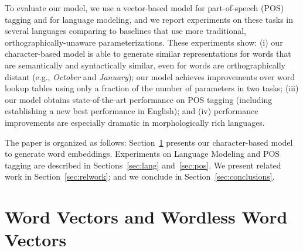 \documentclass[11pt]{article}
\newcommand{\ignore}[1]{}
\newcommand{\examp}[1]{\emph{#1}}
\begin{document}
\begin{CJK*}{UTF8}{gbsn}
To evaluate our model, we use a vector-based model for part-of-speech (POS) tagging and for language modeling, and we report experiments on these tasks in several languages comparing to baselines that use more traditional, orthographically-unaware parameterizations. These experiments show: (i) our character-based model is able to generate similar representations for words that are semantically and syntactically similar, even for words are orthographically distant (e.g., \examp{October} and \examp{January}); our model achieves improvements over word lookup tables using only a fraction of the number of parameters in two tasks; (iii) our model obtains state-of-the-art performance on POS tagging (including establishing a new best performance in English); and (iv) performance improvements are especially dramatic in morphologically rich languages.







The paper is organized as follows:  Section~\ref{sec:c2v} presents our character-based model to generate word embeddings. Experiments on Language Modeling and POS tagging are described in Sections~\ref{sec:lang} and~\ref{sec:pos}. We present related work in Section~\ref{sec:relwork}; and we conclude in Section~\ref{sec:conclusions}.

\section{Word Vectors and Wordless Word Vectors}
\label{sec:c2v}
\ignore{Most NLP methods convert words into a sparse representation, where word types are treated independently. For instance, multinomial distributions that compute the probability of word $w$ being labelled as class $c$ are generally modelled with a table containing an a row for each word type and a column for each possible class. Similarly, in logistic regression a word is converted into ont-hot representation $\mathrm{onehot}(w)$, which is a vector with the size of the vocabulary $V$ and contains the value 1 in index $w$ and zero in all other indexes. As a softmax is performed on this vector, each position of the vector is given its own set of parameters. Thus, in both approaches, the number of parameters required to learn the model is $V\times C$, where $V$ and $C$ are the vocabulary and set of output classes. The obvious drawback of this representation is that if $V$ is very large (e.g., order of millions) it would be computationally expensive to store the parameters in memory. This is why, most unsupervised methods that are trained on large amounts of data, such as Brown Clustering, which requires a multinomial from word types to each cluster, prunes the vocabulary to a tractable size, leading to losses in terms of coverage. Additionally, the independence assumption leads to sparcity problems. As implied by the Zipf's law, only a relatively small number of word types will actually occur frequently enough for the models to generalize, while most word types will rarely occur leading to overfitting. 

}
\end{CJK*}
\end{document}
